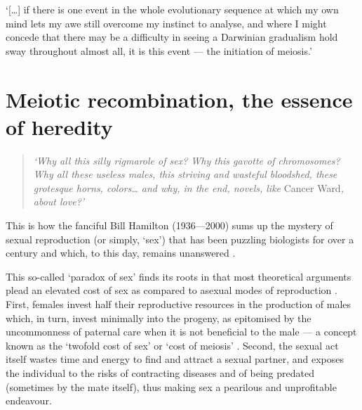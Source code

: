 \begin{savequote}[8cm]
‘[…] if there is one event in the whole evolutionary sequence at which my own mind lets my awe still overcome my instinct to analyse, and where I might concede that there may be a difficulty in seeing a Darwinian gradualism hold sway throughout almost all, it is this event — the initiation of meiosis.’
	
\end{savequote}

\chapter{\label{ch:2-recombination-mechanistics}Meiotic recombination, the essence of heredity} 

\minitoc{}


\begin{quote}
\textit{‘Why all this silly rigmarole of sex? Why this gavotte of chromosomes? Why all these useless males, this striving and wasteful bloodshed, these grotesque horns, colors… and why, in the end, novels, like }Cancer Ward\textit{, about love?’}

\end{quote}

This is how the fanciful Bill Hamilton (1936—2000) sums up the mystery of sexual reproduction (or simply, ‘sex’) that has been puzzling biologists for over a century and which, to this day, remains unanswered \citep{de2007evolution, otto2009evolutionary}.

This so-called ‘paradox of sex’ finds its roots in that most theoretical arguments plead an elevated cost of sex as compared to asexual modes of reproduction \citep{otto2002evolution,lehtonen2012many}.
First, females invest half their reproductive resources in the production of males which, in turn, invest minimally into the progeny, as epitomised by the uncommonness of paternal care when it is not beneficial to the male \citep{smith1977parental,fromhage2007stability} — a concept known as the ‘twofold cost of sex’ or ‘cost of meiosis’ \citep{bell1982masterpiece}.
Second, the sexual act itself wastes time and energy to find and attract a sexual partner, and exposes the individual to the risks of contracting diseases and of being predated (sometimes by the mate itself), thus making sex a pearilous and unprofitable endeavour.

